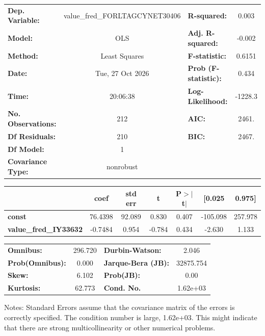 \begin{center}
\begin{tabular}{lclc}
\toprule
\textbf{Dep. Variable:}       & value\_fred\_FORLTAGCYNET30406 & \textbf{  R-squared:         } &     0.003   \\
\textbf{Model:}               &              OLS               & \textbf{  Adj. R-squared:    } &    -0.002   \\
\textbf{Method:}              &         Least Squares          & \textbf{  F-statistic:       } &    0.6151   \\
\textbf{Date:}                &        Tue, 27 Oct 2026        & \textbf{  Prob (F-statistic):} &    0.434    \\
\textbf{Time:}                &            20:06:38            & \textbf{  Log-Likelihood:    } &   -1228.3   \\
\textbf{No. Observations:}    &                212             & \textbf{  AIC:               } &     2461.   \\
\textbf{Df Residuals:}        &                210             & \textbf{  BIC:               } &     2467.   \\
\textbf{Df Model:}            &                  1             & \textbf{                     } &             \\
\textbf{Covariance Type:}     &           nonrobust            & \textbf{                     } &             \\
\bottomrule
\end{tabular}
\begin{tabular}{lcccccc}
                              & \textbf{coef} & \textbf{std err} & \textbf{t} & \textbf{P$> |$t$|$} & \textbf{[0.025} & \textbf{0.975]}  \\
\midrule
\textbf{const}                &      76.4398  &       92.089     &     0.830  &         0.407        &     -105.098    &      257.978     \\
\textbf{value\_fred\_IY33632} &      -0.7484  &        0.954     &    -0.784  &         0.434        &       -2.630    &        1.133     \\
\bottomrule
\end{tabular}
\begin{tabular}{lclc}
\textbf{Omnibus:}       & 296.720 & \textbf{  Durbin-Watson:     } &     2.046  \\
\textbf{Prob(Omnibus):} &   0.000 & \textbf{  Jarque-Bera (JB):  } & 32875.754  \\
\textbf{Skew:}          &   6.102 & \textbf{  Prob(JB):          } &      0.00  \\
\textbf{Kurtosis:}      &  62.773 & \textbf{  Cond. No.          } &  1.62e+03  \\
\bottomrule
\end{tabular}
\end{center}

Notes: \newline
 [1] Standard Errors assume that the covariance matrix of the errors is correctly specified. \newline
 [2] The condition number is large, 1.62e+03. This might indicate that there are \newline
 strong multicollinearity or other numerical problems.